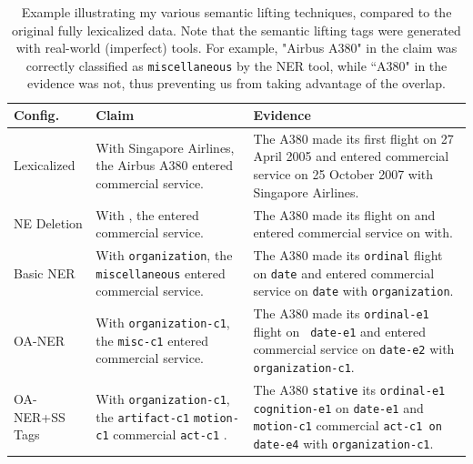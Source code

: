 \documentclass{article}
\begin{document}
\begin{table}[t]
\begin{center}
\begin{tabular}{p{20mm}|p{55mm}|p{70mm}}

\textbf{Config.} & \textbf{Claim}& \textbf{Evidence} \\ \hline
Lexicalized & {With Singapore Airlines, the Airbus A380 entered commercial service.} & {The A380 made its first flight on 27 April 2005 and entered commercial service on 25 October 2007 with Singapore Airlines.}\\
\hline 
NE Deletion & {With  , the  entered commercial service.} & {The A380 made its  flight on  and entered commercial service on  with.}\\
\hline 
Basic NER  & {With \texttt{organization}, the \texttt{miscellaneous} entered commercial service.} & {The A380 made its \texttt{ordinal} flight on \texttt{date} and entered commercial service on \texttt{date} with \texttt{organization}.}\\
\hline 
OA-NER  & {With \texttt{organization-c1}, the \texttt{misc-c1} entered commercial service.} & {The A380 made its \texttt{ordinal-e1} flight on \texttt{ date-e1} and entered commercial service on \texttt{date-e2} with \texttt{organization-c1}.}\\
\hline 

\mbox{OA-NER+SS} Tags & {With \texttt{organization-c1}, the \texttt{artifact-c1} \texttt{motion-c1} commercial \texttt{act-c1} .} & {The A380 \texttt{stative} its \texttt{ordinal-e1 cognition-e1} on \texttt{date-e1} and \texttt{motion-c1} commercial \texttt{act-c1 on date-e4} with \texttt{organization-c1}.  
}\\

\end{tabular}
\end{center}


    \caption{ Example illustrating my various semantic lifting techniques, compared to the original fully lexicalized data. Note that the semantic lifting tags were generated with real-world (imperfect) tools. For example, "Airbus A380" in the claim was correctly classified as \texttt{miscellaneous} by the NER tool, while ``A380" in the evidence was not, thus preventing us from taking advantage of the overlap. }

   
    \label{masking_examples}
\end{table}
\end{document}
